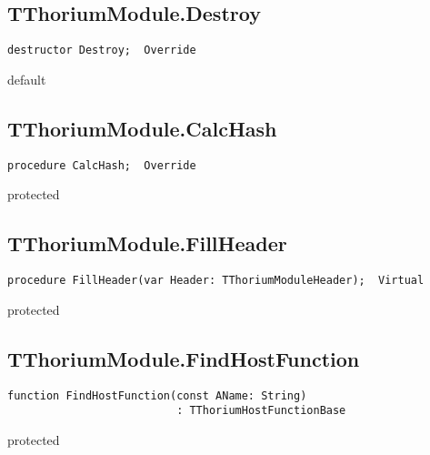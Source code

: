 \subsection{TThoriumModule.Destroy}
\label{thoriumcore:thorium:tthoriummodule:destroy}
\begin{FPCList}
\Synopsis
\Declaration 

\begin{verbatim}
destructor Destroy;  Override
\end{verbatim}
\Visibility
default
\Description
\Errors
\end{FPCList}
\subsection{TThoriumModule.CalcHash}
\label{thoriumcore:thorium:tthoriummodule:calchash}
\begin{FPCList}
\Synopsis
\Declaration 

\begin{verbatim}
procedure CalcHash;  Override
\end{verbatim}
\Visibility
protected
\Description
\Errors
\end{FPCList}
\subsection{TThoriumModule.FillHeader}
\label{thoriumcore:thorium:tthoriummodule:fillheader}
\begin{FPCList}
\Synopsis
\Declaration 

\begin{verbatim}
procedure FillHeader(var Header: TThoriumModuleHeader);  Virtual
\end{verbatim}
\Visibility
protected
\Description
\Errors
\end{FPCList}
\subsection{TThoriumModule.FindHostFunction}
\label{thoriumcore:thorium:tthoriummodule:findhostfunction}
\begin{FPCList}
\Synopsis
\Declaration 

\begin{verbatim}
function FindHostFunction(const AName: String)
                          : TThoriumHostFunctionBase
\end{verbatim}
\Visibility
protected
\Description
\Errors
\end{FPCList}
